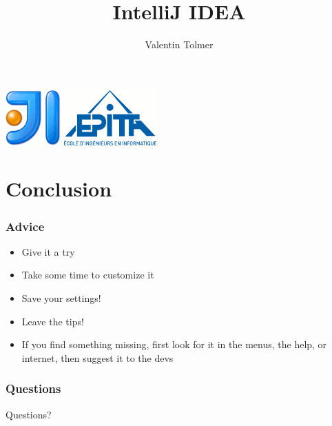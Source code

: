 \documentclass{beamer}
\title{IntelliJ IDEA}
\author{Valentin Tolmer}
\date{}
\institute{GCONFS -- EPITA 2014}
\newlength{\wideitemsep}
\let\olditem\item
\renewcommand{\item}{\setlength{\itemsep}{\wideitemsep}\olditem}
\begin{document}
\begin{frame}
  \titlepage
    \includegraphics[height=60pt]{Logo-idea.png}
    \hfill
    \includegraphics[height=60pt]{Logo-epita.png}
\end{frame}

\begin{frame}
  \tableofcontents[]
\end{frame}





\section{Conclusion}
\begin{frame}
\frametitle{Advice}
  \begin{itemize}
    \item Give it a try
    \item Take some time to customize it
    \item Save your settings!
    \item Leave the tips!
    \item If you find something missing, first look for it in the menus, the
    help, or internet, then suggest it to the devs
  \end{itemize}
\end{frame}

\begin{frame}
\frametitle{Questions}
  Questions?
\end{frame}
\end{document}
